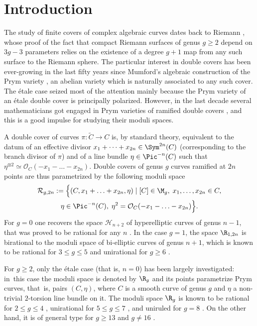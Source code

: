 \section{Introduction}
The study of finite covers of complex algebraic curves dates back to Riemann \cite{Ri}, whose proof of the fact that compact Riemann surfaces of genus $g\geq 2$ depend on $3g-3$ parameters relies on the existence of a degree $g+1$ map from any such surface to the Riemann sphere. The particular interest in double covers has been ever-growing in the last fifty years since Mumford's algebraic construction of the Prym variety \cite{Mu}, an abelian variety which is naturally associated  to any such cover. The étale case seized most of the attention mainly because the Prym variety of an étale double cover is principally polarized. However, in the last decade several mathematicians got engaged in Prym varieties of ramified double covers \cite{MP,NOV,NO}, and this is a good impulse for studying their moduli spaces.

A double cover of curves $\pi:\widetilde C\to C$ is, by standard theory, equivalent to the datum of an effective divisor $x_1+\cdots+x_{2n}\in \Sym^{2n}(C)$ (corresponding to the branch divisor of $\pi$) and of a line bundle $\eta\in \Pic^{-n}(C)$ such that $\eta^{\otimes 2}\simeq \mathcal O_C(-x_1-\ldots-x_{2n})$. Double covers of genus $g$ curves ramified at $2n$ points are thus parametrized by the following moduli space
\begin{multline*}
\mathcal{R}_{g,2n}:= \Big\{(C,x_1+\ldots+x_{2n},\eta)\mid [C]\in\M_g,\; x_1,\ldots,x_{2n} \in C,\\
\eta\in\Pic^{-n}(C),\; \eta^2=\mathcal O_C(-x_1-\ldots-x_{2n}) \Big\}.
\end{multline*}
For $g=0$ one recovers the space $\mathcal H_{n+2}$ of hyperelliptic curves of genus $n-1$, that was proved to be rational for any $n$ \cite{Bo,K1,K2}. In the case $g=1$, the space $\R_{1,2n}$ is birational to the moduli space of bi-elliptic curves of genus $n+1$, which is known to be rational for $3\leq g\leq 5$ \cite{BdC1,BdC2,CdC1} and unirational for $g\geq 6$ \cite{CdC2}.

For $g\geq 2$, only the étale case (that is, $n=0$) has been largely investigated: in~this case the moduli space is denoted by $\R_g$ and its points parametrize Prym curves, that~is, pairs $(C,\eta)$, where $C$ is a smooth curve of genus $g$ and $\eta$ a non-trivial $2$\nobreakdash-torsion line bundle on it. The moduli space $\R_g$ is known to be rational for $2\leq g\leq 4$ \cite{Do2,Ca}, unirational for $5\leq g\leq 7$ \cite{Don,ILS,V1,V2,FV1,FV2}, and uniruled for $g=8$ \cite{FV2}. On the other hand, it is of general type for $g\geq 13$ and $g\neq 16$ \cite{FL,Br}.

